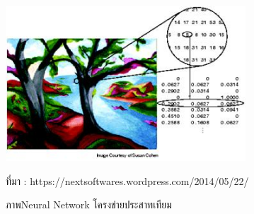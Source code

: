 \begin{itemize}
									\begin{figure}[H]
										\centering
										\includegraphics[width=0.8\textwidth]{Figures/2/6.jpg}
										\caption{ภาพNeural Network โครงข่ายประสาทเทียม}{ที่มา : https://nextsoftwares.wordpress.com/2014/05/22/}
										\label{Fig:Studentloan1}
									\end{figure}

								\end{itemize}

